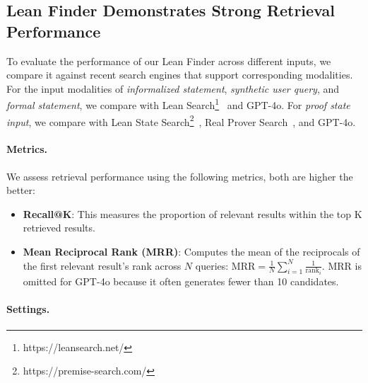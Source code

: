 \documentclass{article} %
\begin{document}
\subsection{Lean Finder Demonstrates Strong Retrieval Performance}
\label{sec:retrieval_result}

To evaluate the performance of our Lean Finder across different inputs, we compare it against recent search engines that support corresponding modalities.
For the input modalities of \emph{informalized statement}, \emph{synthetic user query}, and \emph{formal statement}, we compare with Lean Search\footnote{https://leansearch.net/}~\citep{gao2024semantic,gao2024herald} and GPT-4o.
For \emph{proof state input}, we compare with Lean State Search\footnote{https://premise-search.com/}~\citep{tao2025learningeffectivepremiseretrieval}, Real Prover Search~\citep{shen2025real}, and GPT-4o.


\paragraph{Metrics.}
We assess retrieval performance using the following metrics, both are higher the better:
\begin{itemize}[leftmargin=*]%
    \item \textbf{Recall@K}: This measures the proportion of relevant results within the top K retrieved results.
    \item \textbf{Mean Reciprocal Rank (MRR)}: Computes the mean of the reciprocals of the first relevant result’s rank across \(N\) queries:
$\text{MRR} = \frac{1}{N} \sum_{i=1}^{N} \frac{1}{\text{rank}_i}$. MRR is omitted for GPT-4o because it often generates fewer than 10 candidates.
\end{itemize}


\paragraph{Settings.}
\end{document}
